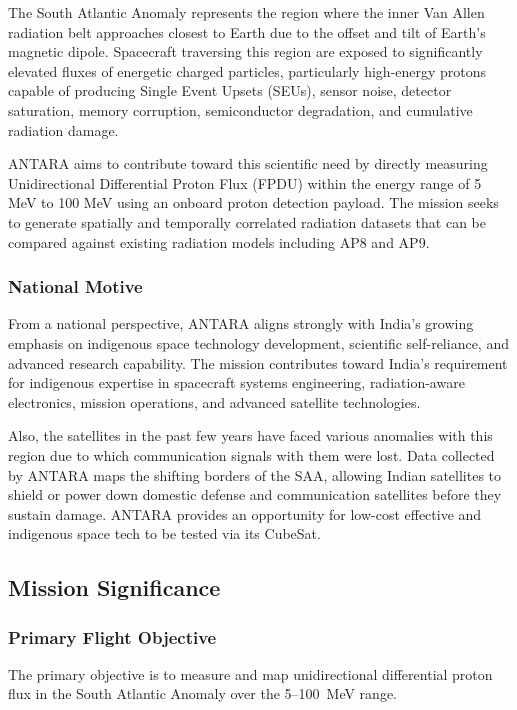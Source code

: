 The South Atlantic Anomaly represents the region where the inner Van
Allen radiation belt approaches closest to Earth due to the offset and
tilt of Earth's magnetic dipole. Spacecraft traversing this region are
exposed to significantly elevated fluxes of energetic charged particles,
particularly high-energy protons capable of producing Single Event
Upsets (SEUs), sensor noise, detector saturation, memory corruption,
semiconductor degradation, and cumulative radiation damage.

ANTARA aims to contribute toward this scientific need by directly
measuring Unidirectional Differential Proton Flux (FPDU) within the
energy range of 5 MeV to 100 MeV using an onboard proton detection
payload. The mission seeks to generate spatially and temporally
correlated radiation datasets that can be compared against existing
radiation models including AP8 and AP9.

\subsubsection{National Motive}\label{national-motive}From a national perspective, ANTARA aligns strongly with India's growing
emphasis on indigenous space technology development, scientific
self-reliance, and advanced research capability. The mission contributes
toward India's requirement for indigenous expertise in spacecraft
systems engineering, radiation-aware electronics, mission operations,
and advanced satellite technologies.

Also, the satellites in the past few years have faced various anomalies
with this region due to which communication signals with them were lost.
Data collected by ANTARA maps the shifting borders of the SAA, allowing
Indian satellites to shield or power down domestic defense and
communication satellites before they sustain damage. ANTARA provides an
opportunity for low-cost effective and indigenous space tech to be
tested via its CubeSat.


\subsection{Mission Significance}\label{mission-significance}

\subsubsection{Primary Flight Objective}\label{primary-flight-objectives}
The primary objective is to measure and map unidirectional differential proton flux in the South Atlantic Anomaly over the 5--100~MeV range.


